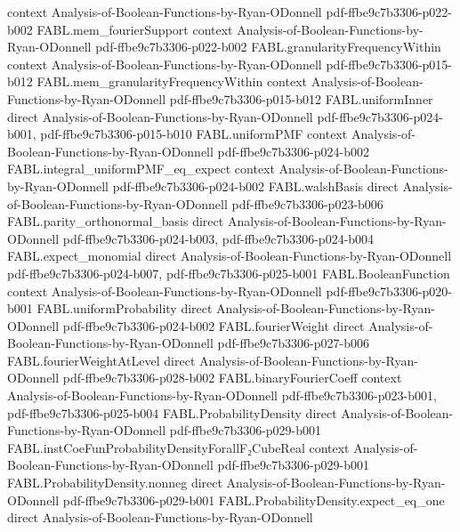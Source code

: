 \begin{theorem}
  {context}
  {Analysis-of-Boolean-Functions-by-Ryan-ODonnell}
  {pdf-ffbe9c7b3306-p022-b002}
\proofstep
  {FABL.mem_fourierSupport}
  {context}
  {Analysis-of-Boolean-Functions-by-Ryan-ODonnell}
  {pdf-ffbe9c7b3306-p022-b002}
\proofstep
  {FABL.granularityFrequencyWithin}
  {context}
  {Analysis-of-Boolean-Functions-by-Ryan-ODonnell}
  {pdf-ffbe9c7b3306-p015-b012}
\proofstep
  {FABL.mem_granularityFrequencyWithin}
  {context}
  {Analysis-of-Boolean-Functions-by-Ryan-ODonnell}
  {pdf-ffbe9c7b3306-p015-b012}
\proofstep
  {FABL.uniformInner}
  {direct}
  {Analysis-of-Boolean-Functions-by-Ryan-ODonnell}
  {pdf-ffbe9c7b3306-p024-b001,
    pdf-ffbe9c7b3306-p015-b010}
\proofstep
  {FABL.uniformPMF}
  {context}
  {Analysis-of-Boolean-Functions-by-Ryan-ODonnell}
  {pdf-ffbe9c7b3306-p024-b002}
\proofstep
  {FABL.integral_uniformPMF_eq_expect}
  {context}
  {Analysis-of-Boolean-Functions-by-Ryan-ODonnell}
  {pdf-ffbe9c7b3306-p024-b002}
\proofstep
  {FABL.walshBasis}
  {direct}
  {Analysis-of-Boolean-Functions-by-Ryan-ODonnell}
  {pdf-ffbe9c7b3306-p023-b006}
\proofstep
  {FABL.parity_orthonormal_basis}
  {direct}
  {Analysis-of-Boolean-Functions-by-Ryan-ODonnell}
  {pdf-ffbe9c7b3306-p024-b003,
    pdf-ffbe9c7b3306-p024-b004}
\proofstep
  {FABL.expect_monomial}
  {direct}
  {Analysis-of-Boolean-Functions-by-Ryan-ODonnell}
  {pdf-ffbe9c7b3306-p024-b007,
    pdf-ffbe9c7b3306-p025-b001}
\proofstep
  {FABL.BooleanFunction}
  {context}
  {Analysis-of-Boolean-Functions-by-Ryan-ODonnell}
  {pdf-ffbe9c7b3306-p020-b001}
\proofstep
  {FABL.uniformProbability}
  {direct}
  {Analysis-of-Boolean-Functions-by-Ryan-ODonnell}
  {pdf-ffbe9c7b3306-p024-b002}
\proofstep
  {FABL.fourierWeight}
  {direct}
  {Analysis-of-Boolean-Functions-by-Ryan-ODonnell}
  {pdf-ffbe9c7b3306-p027-b006}
\proofstep
  {FABL.fourierWeightAtLevel}
  {direct}
  {Analysis-of-Boolean-Functions-by-Ryan-ODonnell}
  {pdf-ffbe9c7b3306-p028-b002}
\proofstep
  {FABL.binaryFourierCoeff}
  {context}
  {Analysis-of-Boolean-Functions-by-Ryan-ODonnell}
  {pdf-ffbe9c7b3306-p023-b001,
    pdf-ffbe9c7b3306-p025-b004}
\proofstep
  {FABL.ProbabilityDensity}
  {direct}
  {Analysis-of-Boolean-Functions-by-Ryan-ODonnell}
  {pdf-ffbe9c7b3306-p029-b001}
\proofstep
  {FABL.instCoeFunProbabilityDensityForallF₂CubeReal}
  {context}
  {Analysis-of-Boolean-Functions-by-Ryan-ODonnell}
  {pdf-ffbe9c7b3306-p029-b001}
\proofstep
  {FABL.ProbabilityDensity.nonneg}
  {direct}
  {Analysis-of-Boolean-Functions-by-Ryan-ODonnell}
  {pdf-ffbe9c7b3306-p029-b001}
\proofstep
  {FABL.ProbabilityDensity.expect_eq_one}
  {direct}
  {Analysis-of-Boolean-Functions-by-Ryan-ODonnell}

\end{theorem}
